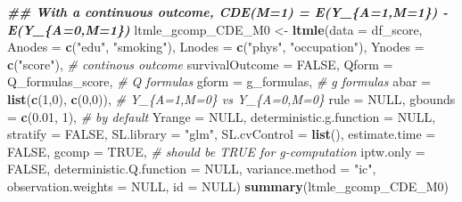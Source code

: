 \documentclass[
]{book}
\newenvironment{Shaded}{\begin{snugshade}}{\end{snugshade}}
\newcommand{\AttributeTok}[1]{\textcolor[rgb]{0.13,0.29,0.53}{#1}}
\newcommand{\CommentTok}[1]{\textcolor[rgb]{0.56,0.35,0.01}{\textit{#1}}}
\newcommand{\ConstantTok}[1]{\textcolor[rgb]{0.56,0.35,0.01}{#1}}
\newcommand{\DecValTok}[1]{\textcolor[rgb]{0.00,0.00,0.81}{#1}}
\newcommand{\DocumentationTok}[1]{\textcolor[rgb]{0.56,0.35,0.01}{\textbf{\textit{#1}}}}
\newcommand{\FloatTok}[1]{\textcolor[rgb]{0.00,0.00,0.81}{#1}}
\newcommand{\FunctionTok}[1]{\textcolor[rgb]{0.13,0.29,0.53}{\textbf{#1}}}
\newcommand{\NormalTok}[1]{#1}
\newcommand{\OtherTok}[1]{\textcolor[rgb]{0.56,0.35,0.01}{#1}}
\newcommand{\StringTok}[1]{\textcolor[rgb]{0.31,0.60,0.02}{#1}}
\begin{document}
\begin{Shaded}
\begin{Highlighting}[]
\DocumentationTok{\#\# With a continuous outcome, CDE(M=1) = E(Y\_\{A=1,M=1\}) {-} E(Y\_\{A=0,M=1\})}
\NormalTok{ltmle\_gcomp\_CDE\_M0 }\OtherTok{\textless{}{-}} \FunctionTok{ltmle}\NormalTok{(}\AttributeTok{data =}\NormalTok{ df\_score,}
                            \AttributeTok{Anodes =} \FunctionTok{c}\NormalTok{(}\StringTok{"edu"}\NormalTok{, }\StringTok{"smoking"}\NormalTok{),}
                            \AttributeTok{Lnodes =} \FunctionTok{c}\NormalTok{(}\StringTok{"phys"}\NormalTok{, }\StringTok{"occupation"}\NormalTok{),}
                            \AttributeTok{Ynodes =} \FunctionTok{c}\NormalTok{(}\StringTok{"score"}\NormalTok{), }\CommentTok{\# continous outcome}
                            \AttributeTok{survivalOutcome =} \ConstantTok{FALSE}\NormalTok{,}
                            \AttributeTok{Qform =}\NormalTok{ Q\_formulas\_score, }\CommentTok{\# Q formulas}
                            \AttributeTok{gform =}\NormalTok{ g\_formulas, }\CommentTok{\# g formulas}
                            \AttributeTok{abar =} \FunctionTok{list}\NormalTok{(}\FunctionTok{c}\NormalTok{(}\DecValTok{1}\NormalTok{,}\DecValTok{0}\NormalTok{),}
                                        \FunctionTok{c}\NormalTok{(}\DecValTok{0}\NormalTok{,}\DecValTok{0}\NormalTok{)), }\CommentTok{\# Y\_\{A=1,M=0\} vs Y\_\{A=0,M=0\}}
                            \AttributeTok{rule =} \ConstantTok{NULL}\NormalTok{,}
                            \AttributeTok{gbounds =} \FunctionTok{c}\NormalTok{(}\FloatTok{0.01}\NormalTok{, }\DecValTok{1}\NormalTok{), }\CommentTok{\# by default}
                            \AttributeTok{Yrange =} \ConstantTok{NULL}\NormalTok{,}
                            \AttributeTok{deterministic.g.function =} \ConstantTok{NULL}\NormalTok{,}
                            \AttributeTok{stratify =} \ConstantTok{FALSE}\NormalTok{,}
                            \AttributeTok{SL.library =} \StringTok{"glm"}\NormalTok{,}
                            \AttributeTok{SL.cvControl =} \FunctionTok{list}\NormalTok{(),}
                            \AttributeTok{estimate.time =} \ConstantTok{FALSE}\NormalTok{,}
                            \AttributeTok{gcomp =} \ConstantTok{TRUE}\NormalTok{, }\CommentTok{\# should be TRUE for g{-}computation}
                            \AttributeTok{iptw.only =} \ConstantTok{FALSE}\NormalTok{,}
                            \AttributeTok{deterministic.Q.function =} \ConstantTok{NULL}\NormalTok{,}
                            \AttributeTok{variance.method =} \StringTok{"ic"}\NormalTok{,}
                            \AttributeTok{observation.weights =} \ConstantTok{NULL}\NormalTok{,}
                            \AttributeTok{id =} \ConstantTok{NULL}\NormalTok{)}
\FunctionTok{summary}\NormalTok{(ltmle\_gcomp\_CDE\_M0)}
\end{Highlighting}
\end{Shaded}
\end{document}
